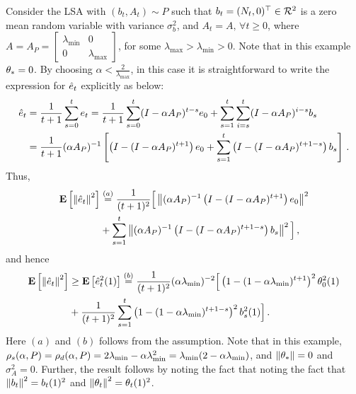 Consider the LSA with $(b_t,A_t)\sim P$ such that $b_t=(N_t,0)^\top\in\mathcal{R}^2$ is a zero mean \iid random variable with variance $\sigma^2_b$, and $A_t=A,\,\forall t\geq 0$, where $A=A_P=\begin{bmatrix} \lambda_{\min} &0\\ 0& \lambda_{\max}\end{bmatrix}$, for some $\lambda_{\max}>\lambda_{\min}>0$. Note that in this example $\theta_*=0$.
By choosing $\alpha<\frac2{\lambda_{\max}}$, in this case it is straightforward to write the expression for $\hat{e}_t$ explicitly as below:
\begin{align*}
\hat{e}_t&=\frac{1}{t+1}\sum_{s=0}^t e_t = \frac{1}{t+1}\sum_{s=0}^t (I-\alpha A_P)^{t-s} e_0 + \sum_{s=1}^t \sum_{i=s}^t (I-\alpha A_P)^{i-s} b_s\\
&=\frac{1}{t+1}(\alpha A_P)^{-1}\left[\left(I-(I-\alpha A_P)^{t+1}\right)e_0 + \sum_{s=1}^t \left(I-(I-\alpha A_P)^{t+1-s}\right) b_s\right]\,.
\end{align*}
Thus,
\begin{align*}
\mathbf{E}\left[\left\| \hat{e}_t\right\|^2\right]&\stackrel{(a)}{=}\frac{1}{(t+1)^2}\Big[\left\| (\alpha A_P)^{-1}\left(I-(I-\alpha A_P)^{t+1}\right)e_0\right\|^2 \\ 
&+\sum_{s=1}^t \left\| (\alpha A_P)^{-1}\left(I-(I-\alpha A_P)^{t+1-s}\right)b_s\right\|^2\Big]\,,
\end{align*}
and hence
\begin{align*}
\mathbf{E}\left[\left\| \hat{e}_t\right\|^2\right]
& \geq \mathbf{E}\left[\hat{e}^2_t(1)\right]\stackrel{(b)}{=}\frac{1}{(t+1)^2}(\alpha \lambda_{\min})^{-2}\Big[\left(1-(1-\alpha \lambda_{\min})^{t+1}\right)^2 \theta^2_0(1)\\
& + \frac{1}{(t+1)^2}\sum_{s=1}^t\left(1-(1-\alpha \lambda_{\min})^{t+1-s}\right)^2 b^2_s(1) \Big]\,.
\end{align*}
Here $(a)$ and $(b)$ follows from the \iid assumption. Note that in this example, $\rho_s(\alpha,P)=\rho_d(\alpha,P)=2\lambda_{\min} -\alpha \lambda_{\min}^2=\lambda_{\min}(2-\alpha \lambda_{\min})$, and $\left\| \theta_*\right\|=0$ and $\sigma^2_A=0$. Further, the result follows by noting the fact that noting the fact that $\left\| b_t\right\|^2=b_t(1)^2$ and $\left\| \theta_t\right\|^2=\theta_t(1)^2$.
